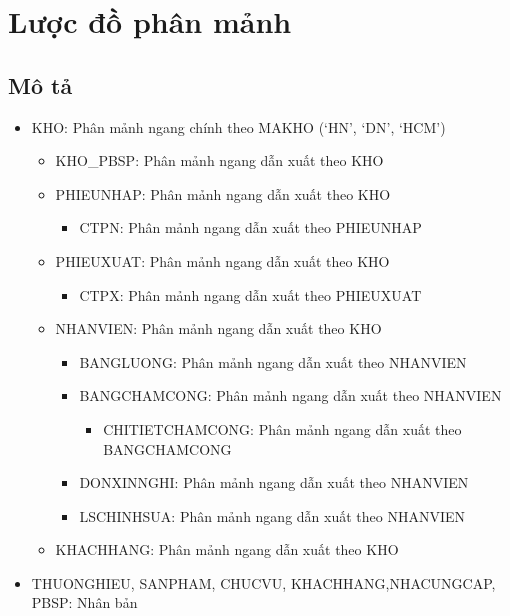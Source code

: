 \documentclass[a4paper,12pt]{report}
\begin{document}
\section{Lược đồ phân mảnh}
\subsection{Mô tả}
\begin{itemize}
    \item KHO: Phân mảnh ngang chính theo MAKHO (‘HN’, ‘DN’, ‘HCM’)
        \begin{itemize}[label=+]
            \item KHO\_PBSP: Phân mảnh ngang dẫn xuất theo KHO
            \item PHIEUNHAP: Phân mảnh ngang dẫn xuất theo KHO
                \begin{itemize}[label=+]
                    \item CTPN: Phân mảnh ngang dẫn xuất theo PHIEUNHAP
                \end{itemize}
            \item PHIEUXUAT: Phân mảnh ngang dẫn xuất theo KHO
                \begin{itemize}[label=+]
                    \item CTPX: Phân mảnh ngang dẫn xuất theo PHIEUXUAT
                \end{itemize}
            \item NHANVIEN: Phân mảnh ngang dẫn xuất theo KHO
                \begin{itemize}[label=+]
                    \item BANGLUONG: Phân mảnh ngang dẫn xuất theo NHANVIEN
                    \item BANGCHAMCONG: Phân mảnh ngang dẫn xuất theo NHANVIEN
                        \begin{itemize}[label=+]
                            \item CHITIETCHAMCONG: Phân mảnh ngang dẫn xuất theo \\ BANGCHAMCONG
                        \end{itemize}
                    \item DONXINNGHI: Phân mảnh ngang dẫn xuất theo NHANVIEN
                    \item LSCHINHSUA: Phân mảnh ngang dẫn xuất theo NHANVIEN
                \end{itemize}
            \item KHACHHANG: Phân mảnh ngang dẫn xuất theo KHO
        \end{itemize}
    \item THUONGHIEU, SANPHAM, CHUCVU, KHACHHANG,\newline NHACUNGCAP, PBSP: Nhân bản
\end{itemize}
\end{document}
